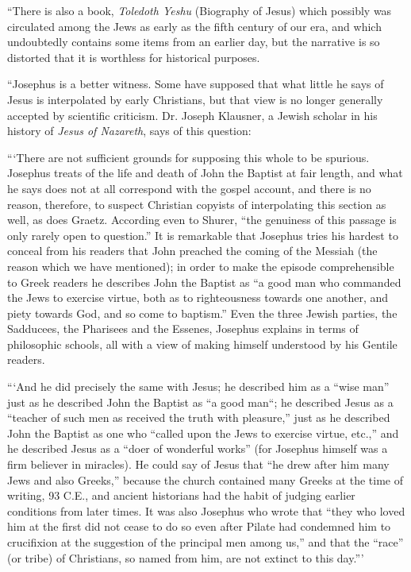 ``There is also a book, \textit{Toledoth Yeshu} (Biography of Jesus) which possibly was circulated
among the Jews as early as the fifth century of our era, and which undoubtedly contains some
items from an earlier day, but the narrative is so distorted that it is worthless for historical
purposes.

``Josephus is a better witness. Some have supposed that what little he says of Jesus is
interpolated by early Christians, but that view is no longer generally accepted by scientific
criticism. Dr. Joseph Klausner, a Jewish scholar in his history of \textit{Jesus of Nazareth}, says of
this question:

```There are not sufficient grounds for supposing this whole to be spurious. Josephus treats of
the life and death of John the Baptist at fair length, and what he says does not at all
correspond with the gospel account, and there is no reason, therefore, to suspect Christian
copyists of interpolating this section as well, as does Graetz. According even to Shurer, ``the
genuiness of this passage is only rarely open to question.'' It is remarkable that Josephus tries
his hardest to conceal from his readers that John preached the coming of the Messiah (the
reason which we have mentioned); in order to make the episode comprehensible to Greek
readers he describes John the Baptist as ``a good man who commanded the Jews to exercise
virtue, both as to righteousness towards one another, and piety towards God, and so come to
baptism.'' Even the three Jewish parties, the Sadducees, the Pharisees and the Essenes,
Josephus explains in terms of philosophic schools, all with a view of making himself
understood by his Gentile readers.

```And he did precisely the same with Jesus; he described him as a ``wise man'' just as he
described John the Baptist as ``a good man``; he described Jesus as a ``teacher of such men as
received the truth with pleasure,'' just as he described John the Baptist as one who ``called
upon the Jews to exercise virtue, etc.,'' and he described Jesus as a ``doer of wonderful works''
(for Josephus himself was a firm believer in miracles). He could say of Jesus that ``he drew
after him many Jews and also Greeks,'' because the church contained many Greeks at the
time of writing, 93 C.E., and ancient historians had the habit of judging earlier conditions
from later times. It was also Josephus who wrote that ``they who loved him at the first did not
cease to do so even after Pilate had condemned him to crucifixion at the suggestion of the
principal men among us,'' and that the ``race'' (or tribe) of Christians, so named from him, are
not extinct to this day.'''


